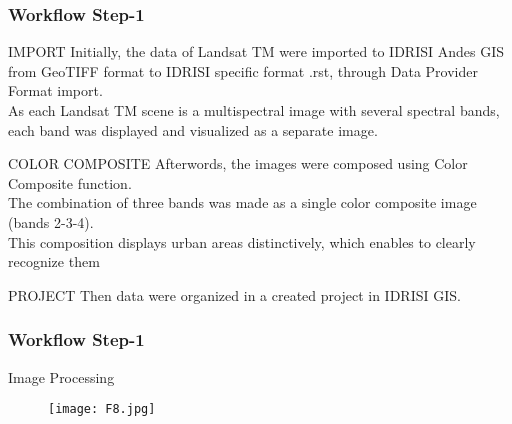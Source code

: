 \documentclass[pdflatex,compress,9pt,
	xcolor={dvipsnames,dvipsnames,svgnames,x11names,table},
	hyperref={colorlinks = true,breaklinks = true, urlcolor = NavyBlue, breaklinks = true}]{beamer}
\begin{document}
\begin{frame}\frametitle{Workflow Step-1}

\begin{block}{IMPORT}
Initially, the data of Landsat TM were imported to IDRISI Andes GIS from \alert{GeoTIFF} format to IDRISI specific format \alert{.rst}, through \alert{Data Provider Format} import.\\ As each Landsat TM scene is a multispectral image with several spectral bands, each band was displayed and visualized as a separate image.
\end{block}

\begin{block}{COLOR COMPOSITE}
Afterwords, the images were composed using \alert{Color Composite} function. \\
The combination of three bands was made as a single color composite image (bands 2-3-4).\\
 This composition displays urban areas distinctively, which enables to clearly recognize them
\end{block}

\begin{block}{PROJECT}
Then data were organized in a created project in \alert{IDRISI GIS}.
\end{block}

\end{frame}

\begin{frame}\frametitle{Workflow Step-1}
\begin{examples}{Image Processing}
\end{examples}
\begin{figure}[H]
	\centering
		\texttt{[image: F8.jpg]}
\end{figure}
\end{frame}
\end{document}
